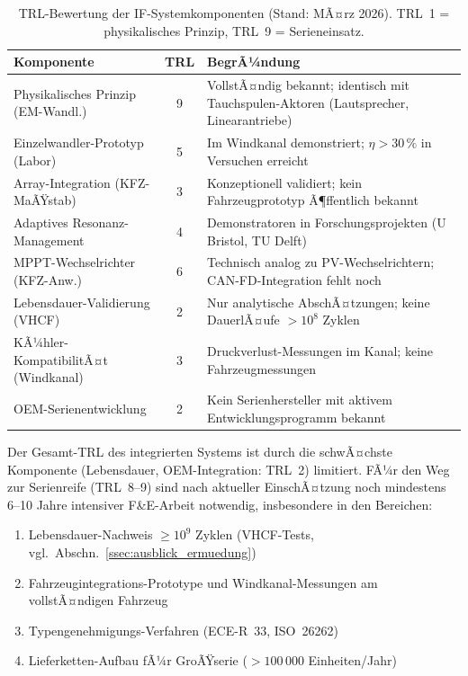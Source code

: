 ﻿\documentclass[12pt, a4paper]{report}
\theoremstyle{definition}
\theoremstyle{remark}
\begin{document}
\begin{table}[H]
  \centering
  \caption{TRL-Bewertung der IF-Systemkomponenten (Stand: MÃ¤rz 2026).
           TRL~1 = physikalisches Prinzip, TRL~9 = Serieneinsatz.}
  \label{tab:trl}
  \begin{tabular}{lc>{\raggedright\arraybackslash}p{6.8cm}}
    \toprule
    Komponente & TRL & BegrÃ¼ndung \\
    \midrule
    Physikalisches Prinzip (EM-Wandl.)   & 9 &
      VollstÃ¤ndig bekannt; identisch mit Tauchspulen-Aktoren (Lautsprecher,
      Linearantriebe) \\
    Einzelwandler-Prototyp (Labor)         & 5 &
      Im Windkanal demonstriert; $\eta > 30\,\%$ in Versuchen erreicht \\
    Array-Integration (KFZ-MaÃŸstab)       & 3 &
      Konzeptionell validiert; kein Fahrzeugprototyp Ã¶ffentlich bekannt \\
    Adaptives Resonanz-Management         & 4 &
      Demonstratoren in Forschungsprojekten (U Bristol, TU Delft) \\
    MPPT-Wechselrichter (KFZ-Anw.)   & 6 &
      Technisch analog zu PV-Wechselrichtern; CAN-FD-Integration fehlt noch \\
    Lebensdauer-Validierung (VHCF)        & 2 &
      Nur analytische AbschÃ¤tzungen; keine DauerlÃ¤ufe $> 10^8$ Zyklen \\
    KÃ¼hler-KompatibilitÃ¤t (Windkanal)     & 3 &
      Druckverlust-Messungen im Kanal; keine Fahrzeugmessungen \\
    OEM-Serienentwicklung                 & 2 &
      Kein Serienhersteller mit aktivem Entwicklungsprogramm bekannt \\
    \bottomrule
  \end{tabular}
\end{table}

Der Gesamt-TRL des integrierten Systems ist durch die schwÃ¤chste Komponente
(Lebensdauer, OEM-Integration: TRL~2) limitiert. FÃ¼r den Weg zur Serienreife
(TRL~8--9) sind nach aktueller EinschÃ¤tzung noch mindestens 6--10 Jahre
intensiver F\&E-Arbeit notwendig, insbesondere in den Bereichen:

\begin{enumerate}[leftmargin=2em]
  \item Lebensdauer-Nachweis $\geq 10^9$ Zyklen (VHCF-Tests, vgl.\
        Abschn.~\ref{ssec:ausblick_ermuedung})
  \item Fahrzeugintegrations-Prototype und Windkanal-Messungen am
        vollstÃ¤ndigen Fahrzeug
  \item Typengenehmigungs-Verfahren (ECE-R~33, ISO~26262)
  \item Lieferketten-Aufbau fÃ¼r GroÃŸ\-serie ($> 100\,000$ Einheiten/Jahr)
\end{enumerate}
\end{document}

